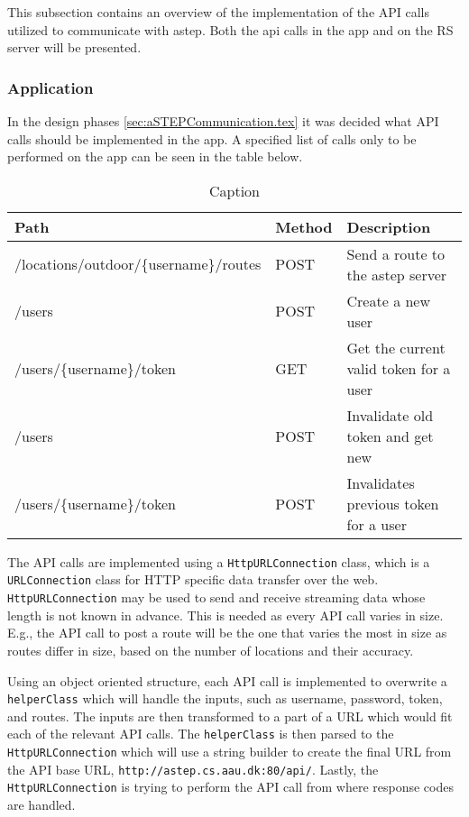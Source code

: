 This subsection contains an overview of the implementation of the API calls utilized to communicate with \gls{astep}.
Both the api calls in the app and on the RS server will be presented.

 \subsubsection{Application}
In the design phases \ref{sec:aSTEPCommunication.tex} it was decided what API calls should be implemented in the app.
A specified list of calls only to be performed on the app can be seen in the table below.

\begin{table}[h]
	\centering
	\scriptsize
	\begin{tabular}{l l l}
		Path & Method & Description\\\midrule
		/locations/outdoor/\{username\}/routes & POST & Send a route to the \gls{astep} server\\
		/users & POST & Create a new user\\
		/users/\{username\}/token & GET & Get the current valid token for a user\\
		/users & POST & Invalidate old token and get new\\
		/users/\{username\}/token & POST & Invalidates previous token for a user\\
	\end{tabular}
	\caption{Caption}
	\label{tab:asteprequests}
\end{table} 

The API calls are implemented using a \texttt{HttpURLConnection} class, which is a \texttt{URLConnection} class for HTTP specific data transfer over the web.
\texttt{HttpURLConnection} may be used to send and receive streaming data whose length is not known in advance.
This is needed as every API call varies in size.
E.g., the API call to post a route will be the one that varies the most in size as routes differ in size, based on the number of locations and their accuracy.


Using an object oriented structure, each API call is implemented to overwrite a \texttt{helperClass} which will handle the inputs, such as username, password, token, and routes.
The inputs are then transformed to a part of a URL which would fit each of the relevant API calls.
The \texttt{helperClass} is then parsed to the \texttt{HttpURLConnection} which will use a string builder to create the final URL from the API base URL, \texttt{http://astep.cs.aau.dk:80/api/}.
Lastly, the \texttt{HttpURLConnection} is trying to perform the API call from where response codes are handled.

